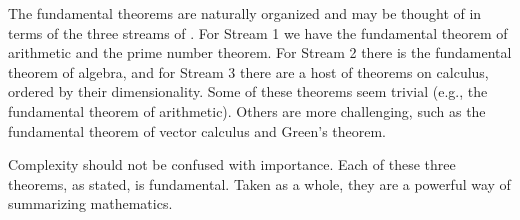 \documentclass{ximera}
\begin{document}
The fundamental theorems are naturally organized and may be thought of in terms of the three streams of \citet{JS10}.
For Stream 1 we have the fundamental theorem of arithmetic and the prime number theorem. 
For Stream 2 there is the fundamental theorem of algebra,%
and for Stream 3 there are a host of theorems on calculus, ordered by their dimensionality. 
Some of these theorems seem trivial (e.g., the fundamental theorem of arithmetic).  Others are
more challenging, such as the fundamental theorem of vector calculus and Green's theorem.

Complexity should not be confused with importance. Each of these three theorems, as stated, is fundamental.
Taken as a whole, they are a powerful way of summarizing mathematics.
\end{document}
